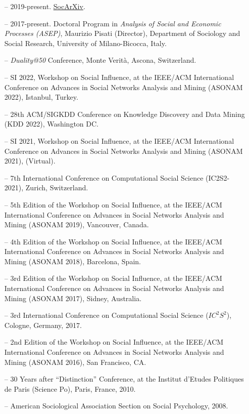 \begin{itemize}[itemsep=-0.5ex]
    \item[--] 2019-present. \href{https://socopen.org/}{SocArXiv}.
    \item[--] 2017-present. Doctoral Program in {\em Analysis of Social and Economic Processes (ASEP)}, Maurizio Pisati (Director), Department of Sociology and Social Research, University of Milano-Bicocca, Italy. 
\end{itemize}

\begin{itemize}[itemsep=-0.5ex]
    \item[--] \textit{Duality@50} Conference, Monte Verit\`{a}, Ascona, Switzerland.
\end{itemize}

\begin{itemize}[itemsep=-0.5ex]
    \item[--] SI 2022, Workshop on Social Influence, at the IEEE/ACM International Conference on Advances in Social Networks Analysis and Mining (ASONAM 2022), Istanbul, Turkey.
    \item[--] 28th ACM/SIGKDD Conference on Knowledge Discovery and Data Mining (KDD 2022), Washington DC.
    \item[--] SI 2021, Workshop on Social Influence, at the IEEE/ACM International Conference on Advances in Social Networks Analysis and Mining (ASONAM 2021), (Virtual).
    \item[--] 7th International Conference on Computational Social Science (IC2S2-2021), Zurich, Switzerland.
    \item[--] 5th Edition of the Workshop on Social Influence, at the IEEE/ACM International Conference on Advances in Social Networks Analysis and Mining (ASONAM 2019), Vancouver, Canada. 
    \item[--] 4th Edition of the Workshop on Social Influence, at the IEEE/ACM International Conference on Advances in Social Networks Analysis and Mining (ASONAM 2018), Barcelona, Spain. 
    \item[--] 3rd Edition of the Workshop on Social Influence, at the IEEE/ACM International Conference on Advances in Social Networks Analysis and Mining (ASONAM 2017), Sidney, Australia. 
    \item[--] 3rd International Conference on Computational Social Science ($IC^2S^2$), Cologne, Germany, 2017. 
    \item[--] 2nd Edition of the Workshop on Social Influence, at the IEEE/ACM International Conference on Advances in Social Networks Analysis and Mining (ASONAM 2016), San Francisco, CA. 
    \item[--] 30 Years after ``Distinction'' Conference, at the Institut d'Etudes Politiques de Paris (Science Po), Paris, France, 2010.
    \item[--] American Sociological Association Section on Social Psychology, 2008.
\end{itemize}